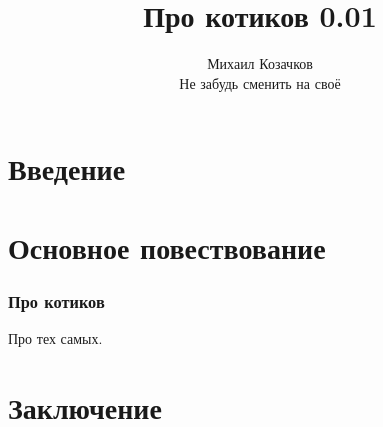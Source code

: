 \documentclass[12pt]{article}
\begin{document}
\title{Про котиков 0.01}
\author{Михаил Козачков\\Не забудь сменить на своё}
\maketitle
\newpage

\renewcommand{\contentsname}{Содержание}
\tableofcontents
\newpage

\part{Введение}

\newpage

\part{Основное повествование}

\section{Про котиков}

Про тех самых.



\newpage

\part{Заключение}
\end{document}
